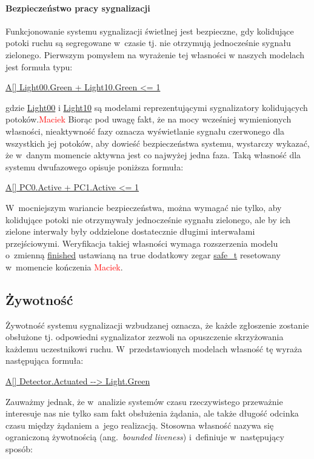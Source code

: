 \documentclass{pracamgr}
\newcommand{\todo}[1]{\textcolor{red}{#1}}
\newcommand{\ang}[1]{(ang.~\emph{#1})}
\newcommand{\ttt}[1]{\url{#1}}
\newcommand{\tttform}[1]{
  \begin{center}
    \ttt{#1}
  \end{center}
}
\theoremstyle{plain}
\begin{document}
\paragraph{Bezpieczeństwo pracy sygnalizacji}
Funkcjonowanie systemu sygnalizacji świetlnej jest bezpieczne, gdy
kolidujące potoki ruchu są segregowane w~czasie tj. nie otrzymują
jednocześnie sygnału zielonego. Pierwszym pomysłem na wyrażenie tej
własności w naszych modelach jest formuła typu:
\tttform{A[] Light00.Green + Light10.Green <= 1}
gdzie \ttt{Light00} i \ttt{Light10} są modelami reprezentującymi
sygnalizatory kolidujących potoków.\todo{Maciek}
Biorąc pod uwagę fakt, że na mocy wcześniej wymienionych
własności, nieaktywność fazy oznacza wyświetlanie sygnału czerwonego
dla wszystkich jej potoków, aby dowieść bezpieczeństwa systemu,
wystarczy wykazać, że w~danym momencie aktywna jest co najwyżej jedna
faza. Taką własność dla systemu dwufazowego opisuje poniższa formuła:
\begin{center}
  \url{A[] PC0.Active + PC1.Active <= 1}
\end{center}

W~mocniejszym wariancie bezpieczeństwa, można wymagać nie tylko, aby
kolidujące potoki nie otrzymywały jednocześnie sygnału zielonego, ale
by ich zielone interwały były oddzielone dostatecznie długimi
interwałami przejściowymi. Weryfikacja takiej własności wymaga
rozszerzenia modelu o~zmienną \url{finished} ustawianą na true dodatkowy zegar \url{safe_t} resetowany
w~momencie kończenia \todo{Maciek}.

\subsection{Żywotność}
\label{s:properties:liveness}

Żywotność systemu sygnalizacji wzbudzanej oznacza, że każde zgłoszenie
zostanie obsłużone tj. odpowiedni sygnalizator zezwoli na opuszczenie
skrzyżowania każdemu uczestnikowi ruchu. W~przedstawionych modelach
własność tę wyraża następująca formuła:
\tttform{A[] Detector.Actuated --> Light.Green}
Zauważmy jednak, że w~analizie systemów czasu rzeczywistego przeważnie
interesuje nas nie tylko sam fakt obsłużenia żądania, ale także
długość odcinka czasu między żądaniem a~jego realizacją. Stosowna
własność nazywa się ograniczoną żywotnością \ang{bounded liveness}
i~definiuje w~następujący sposób:
\end{document}
